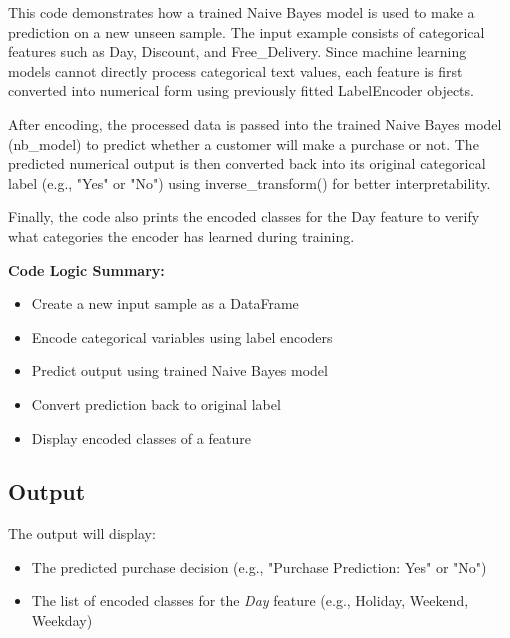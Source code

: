 \documentclass[11pt]{article}
\begin{document}
This code demonstrates how a trained Naive Bayes model is used to make a prediction on a new unseen sample. The input example consists of categorical features such as Day, Discount, and Free\_Delivery. Since machine learning models cannot directly process categorical text values, each feature is first converted into numerical form using previously fitted LabelEncoder objects.

After encoding, the processed data is passed into the trained Naive Bayes model (nb\_model) to predict whether a customer will make a purchase or not. The predicted numerical output is then converted back into its original categorical label (e.g., "Yes" or "No") using inverse\_transform() for better interpretability.

Finally, the code also prints the encoded classes for the Day feature to verify what categories the encoder has learned during training.

\textbf{Code Logic Summary:}
\begin{itemize}
\item Create a new input sample as a DataFrame
\item Encode categorical variables using label encoders
\item Predict output using trained Naive Bayes model
\item Convert prediction back to original label
\item Display encoded classes of a feature
\end{itemize}

\subsection*{Output}

The output will display:
\begin{itemize}
\item The predicted purchase decision (e.g., "Purchase Prediction: Yes" or "No")
\item The list of encoded classes for the \textit{Day} feature (e.g., {Holiday, Weekend, Weekday})
\end{itemize}
\end{document}
